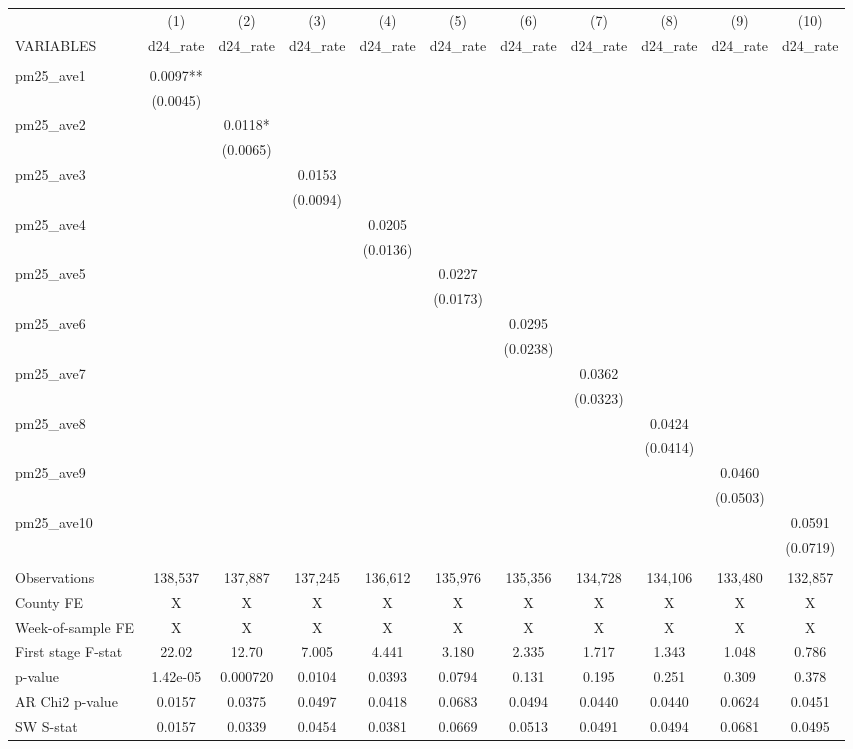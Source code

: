 \begin{tabular}{lcccccccccc} \hline
 & (1) & (2) & (3) & (4) & (5) & (6) & (7) & (8) & (9) & (10) \\
VARIABLES & d24\_rate & d24\_rate & d24\_rate & d24\_rate & d24\_rate & d24\_rate & d24\_rate & d24\_rate & d24\_rate & d24\_rate \\ \hline
 &  &  &  &  &  &  &  &  &  &  \\
pm25\_ave1 & 0.0097** &  &  &  &  &  &  &  &  &  \\
 & (0.0045) &  &  &  &  &  &  &  &  &  \\
pm25\_ave2 &  & 0.0118* &  &  &  &  &  &  &  &  \\
 &  & (0.0065) &  &  &  &  &  &  &  &  \\
pm25\_ave3 &  &  & 0.0153 &  &  &  &  &  &  &  \\
 &  &  & (0.0094) &  &  &  &  &  &  &  \\
pm25\_ave4 &  &  &  & 0.0205 &  &  &  &  &  &  \\
 &  &  &  & (0.0136) &  &  &  &  &  &  \\
pm25\_ave5 &  &  &  &  & 0.0227 &  &  &  &  &  \\
 &  &  &  &  & (0.0173) &  &  &  &  &  \\
pm25\_ave6 &  &  &  &  &  & 0.0295 &  &  &  &  \\
 &  &  &  &  &  & (0.0238) &  &  &  &  \\
pm25\_ave7 &  &  &  &  &  &  & 0.0362 &  &  &  \\
 &  &  &  &  &  &  & (0.0323) &  &  &  \\
pm25\_ave8 &  &  &  &  &  &  &  & 0.0424 &  &  \\
 &  &  &  &  &  &  &  & (0.0414) &  &  \\
pm25\_ave9 &  &  &  &  &  &  &  &  & 0.0460 &  \\
 &  &  &  &  &  &  &  &  & (0.0503) &  \\
pm25\_ave10 &  &  &  &  &  &  &  &  &  & 0.0591 \\
 &  &  &  &  &  &  &  &  &  & (0.0719) \\
 &  &  &  &  &  &  &  &  &  &  \\
Observations & 138,537 & 137,887 & 137,245 & 136,612 & 135,976 & 135,356 & 134,728 & 134,106 & 133,480 & 132,857 \\
County FE & X & X & X & X & X & X & X & X & X & X \\
Week-of-sample FE & X & X & X & X & X & X & X & X & X & X \\
First stage F-stat & 22.02 & 12.70 & 7.005 & 4.441 & 3.180 & 2.335 & 1.717 & 1.343 & 1.048 & 0.786 \\
p-value & 1.42e-05 & 0.000720 & 0.0104 & 0.0393 & 0.0794 & 0.131 & 0.195 & 0.251 & 0.309 & 0.378 \\
AR Chi2 p-value & 0.0157 & 0.0375 & 0.0497 & 0.0418 & 0.0683 & 0.0494 & 0.0440 & 0.0440 & 0.0624 & 0.0451 \\
 SW S-stat & 0.0157 & 0.0339 & 0.0454 & 0.0381 & 0.0669 & 0.0513 & 0.0491 & 0.0494 & 0.0681 & 0.0495 \\ \hline
\end{tabular}
